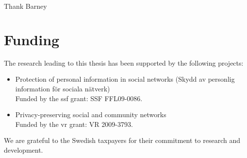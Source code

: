 Thank Barney


\section*{Funding}
The research leading to this thesis has been supported by the following projects:
\begin{itemize}
    \item Protection of personal information in social networks (Skydd av personlig 
    information f{\"o}r sociala n{\"a}tverk)\\
    Funded by the \ac*{ssf} grant: SSF FFL09-0086.
    \item Privacy-preserving social and community networks\\
    Funded by the \ac*{vr} grant: VR 2009-3793.
\end{itemize}

We are grateful to the Swedish taxpayers for their commitment to research and development.
